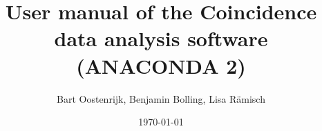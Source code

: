 \newpage


\title{User manual of the Coincidence data analysis software (ANACONDA 2)}
\author{Bart Oostenrijk, Benjamin Bolling, Lisa Rämisch}
\date{\today} %


\maketitle
\tableofcontents
\newpage





%
%



